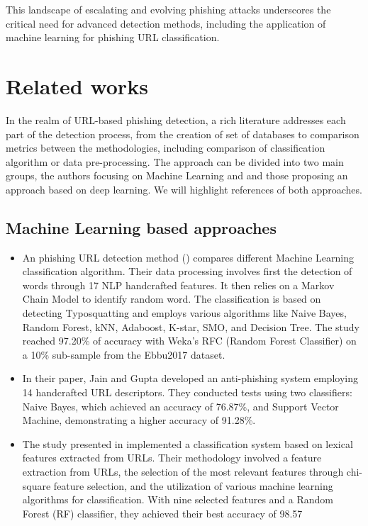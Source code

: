 \documentclass{article}
\begin{document}
    This landscape of escalating and evolving phishing attacks underscores the critical need for advanced detection methods, including the application of machine learning for phishing URL classification.


    \section{Related works}\label{sec:related-works}

    In the realm of URL-based phishing detection, a rich literature addresses each part of the detection process, from the creation of set of databases to comparison metrics between the methodologies, including comparison of classification algorithm or data pre-processing.
    The approach can be divided into two main groups, the authors focusing on Machine Learning and and those proposing an approach based on deep learning.
    We will highlight references of both approaches.

    \subsection{Machine Learning based approaches}\label{subsec:machine-learning-based-approaches}

    \begin{itemize}

        \item An phishing URL detection method (\cite{PhishingURLDetection}) compares different Machine Learning classification algorithm.
        Their data processing involves first the detection of words through 17 NLP handcrafted features.
        It then relies on a Markov Chain Model to identify random word.
        The classification is based on detecting Typosquatting and employs various algorithms like Naive Bayes, Random Forest, kNN, Adaboost, K-star, SMO, and Decision Tree.
        The study reached 97.20\% of accuracy with Weka's RFC (Random Forest Classifier) on a 10\% sub-sample from the Ebbu2017 dataset.

        \item In their paper\cite{PhishSafe}, Jain and Gupta developed an anti-phishing system employing 14 handcrafted URL descriptors.
        They conducted tests using two classifiers: Naive Bayes, which achieved an accuracy of 76.87\%, and Support Vector Machine, demonstrating a higher accuracy of 91.28\%.

        \item The study presented in\cite{LexicalFeatureSelection} implemented a classification system based on lexical features extracted from URLs. Their methodology involved a feature extraction from URLs, the selection of the most relevant features through chi-square feature selection, and the utilization of various machine learning algorithms for classification.
        With nine selected features and a Random Forest (RF) classifier, they achieved their best accuracy of 98.57%

    \end{itemize}
\end{document}
